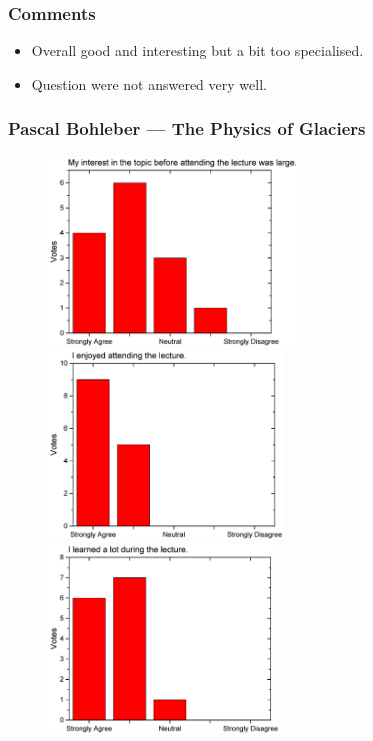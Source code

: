 \subsubsection*{Comments}
\begin{itemize}
\item Overall good  and interesting but a bit too specialised.
\item Question were not answered very well.
\end{itemize}
\newpage


\subsubsection{Pascal Bohleber  --- The Physics of Glaciers }
\begin{figure}[h!]
  \centering
  \begin{minipage}{.48\linewidth}
    \centering
      {\includegraphics[height=50mm]{figures/n/Graph51.pdf}}
      {\includegraphics[height=50mm]{figures/n/Graph52.pdf}}
      {\includegraphics[height=50mm]{figures/n/Graph53.pdf}}

\end{minipage}
\end{figure}
